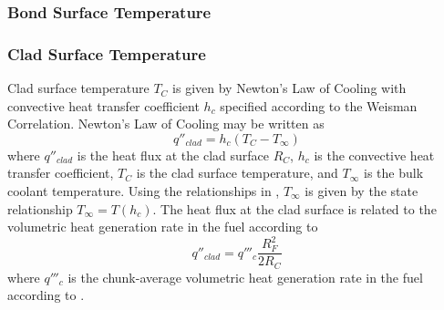     \subsubsection{Bond Surface Temperature}


    \subsubsection{Clad Surface Temperature}
      Clad surface temperature $T_C$ is given by Newton's Law of Cooling with
      convective heat transfer coefficient $h_c$ specified according to the
      Weisman Correlation. Newton's Law of Cooling may be written as
      \begin{equation}
        q''_{clad} = h_c (T_C - T_{\infty})
      \end{equation}
      where $q''_{clad}$ is the heat flux at the clad surface $R_C$, $h_c$ is
      the convective heat transfer coefficient, $T_C$ is the clad surface
      temperature, and $T_{\infty}$ is the bulk coolant temperature. Using the
      relationships in , $T_{\infty}$ is given
      by the state relationship $T_{\infty} = T(h_c)$. The heat flux at the clad
      surface is related to the volumetric heat generation rate in the fuel
      according to 
      \begin{equation}
        q''_{clad} = q'''_c \frac{R_F^2}{2 R_C}
      \end{equation}
      where $q'''_c$ is the chunk-average volumetric heat generation rate in the
      fuel according to .

